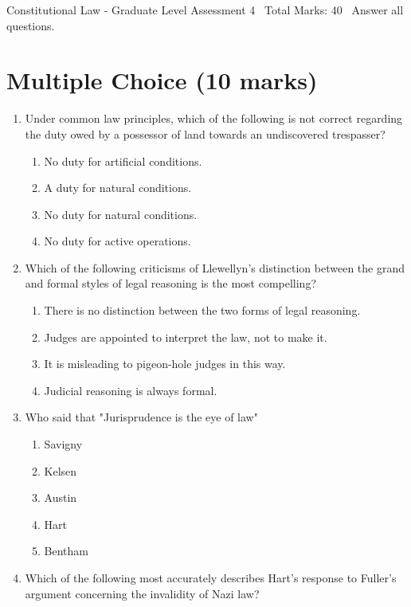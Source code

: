 \documentclass[12pt]{article}
\begin{document}
\begin{center}
Constitutional Law - Graduate Level Assessment 4 \
Total Marks: 40 \
Answer all questions.
\end{center}

\section*{Multiple Choice (10 marks)}
\begin{enumerate}[label=\arabic*.]
\item Under common law principles, which of the following is not correct regarding the duty owed by a possessor of land towards an undiscovered trespasser?
\begin{enumerate}[label=(\alph*)]
    \item No duty for artificial conditions.
    \item A duty for natural conditions.
    \item No duty for natural conditions.
    \item No duty for active operations.
\end{enumerate}
\item Which of the following criticisms of Llewellyn's distinction between the grand and formal styles of legal reasoning is the most compelling?
\begin{enumerate}[label=(\alph*)]
    \item There is no distinction between the two forms of legal reasoning.
    \item Judges are appointed to interpret the law, not to make it.
    \item It is misleading to pigeon-hole judges in this way.
    \item Judicial reasoning is always formal.
\end{enumerate}
\item Who said that "Jurisprudence is the eye of law"
\begin{enumerate}[label=(\alph*)]
    \item Savigny
    \item Kelsen
    \item Austin
    \item Hart
    \item Bentham
\end{enumerate}
\item Which of the following most accurately describes Hart's response to Fuller's argument concerning the invalidity of Nazi law?
\begin{enumerate}[label=(\alph*)]

\end{enumerate}
\end{enumerate}
\end{document}
